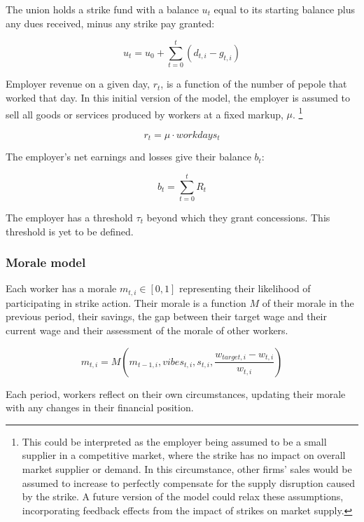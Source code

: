 \documentclass[a4paper]{article}
\begin{document}
The union holds a strike fund with a balance $u_{t}$ equal to its starting balance plus any dues received, minus any strike pay granted:

\begin{equation}
    u_{t} = u_{0} + \sum_{t=0}^{t} (d_{t,i}-g_{t,i})
\end{equation}

Employer revenue on a given day, $r_t$, is a function of the number of pepole that worked that day. In this initial version of the model, the employer is assumed to sell all goods or services produced by workers at a fixed markup, $\mu$. \footnote{This could be interpreted as the employer being assumed to be a small supplier in a competitive market, where the strike has no impact on overall market supplier or demand. In this circumstance, other firms' sales would be assumed to increase to perfectly compensate for the supply disruption caused by the strike. A future version of the model could relax these assumptions, incorporating feedback effects from the impact of strikes on market supply.}

\begin{equation}
r_t = \mu \cdot workdays_t
\end{equation}

The employer's net earnings and losses give their balance $b_t$:

\begin{equation}
    b_t = \sum_{t=0}^{t} R_t
\end{equation}

The employer has a threshold $\tau_t$ beyond which they grant concessions. This threshold is yet to be defined.

\subsubsection{Morale model}

Each worker has a morale $m_{t,i} \in[0,1]$ representing their likelihood of participating in strike action. Their morale is a function $M$ of their morale in the previous period, their savings, the gap between their target wage and their current wage and their assessment of the morale of other workers.

\begin{equation}
    m_{t,i} = M(m_{t-1,i}, vibes_{t,i}, s_{t,i}, \frac{w_{target,i}-w_{t,i}}{w_{t,i}})
\end{equation}

Each period, workers reflect on their own circumstances, updating their morale with any changes in their financial position. 
\end{document}

